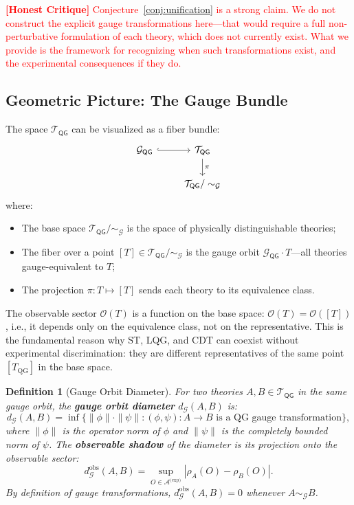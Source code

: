 \documentclass[12pt,a4paper]{article}
\newtheorem{definition}[theorem]{Definition}
\theoremstyle{remark}
\newcommand{\Obs}{\mathcal{O}}
\newcommand{\G}{\mathcal{G}}
\newcommand{\T}{\mathcal{T}}
\newcommand{\A}{\mathcal{A}}
\newcommand{\QG}{\textsf{QG}}
\newcommand{\honestcrit}[1]{\textcolor{red}{\textbf{[Honest Critique]} #1}}
\begin{document}
\honestcrit{Conjecture~\ref{conj:unification} is a strong claim. We do not construct the explicit gauge transformations here---that would require a full non-perturbative formulation of each theory, which does not currently exist. What we provide is the framework for recognizing when such transformations exist, and the experimental consequences if they do.}

\subsection{Geometric Picture: The Gauge Bundle}

The space $\T_{\QG}$ can be visualized as a fiber bundle:
\begin{equation}
  \begin{tikzcd}
    \G_{\QG} \arrow[r, hook] & \T_{\QG} \arrow[d, "\pi"] \\
    & \T_{\QG} / \sim_{\G}
  \end{tikzcd}
\end{equation}
where:
\begin{itemize}[leftmargin=*]
  \item The base space $\T_{\QG} / \sim_{\G}$ is the space of physically distinguishable theories;
  \item The fiber over a point $[T] \in \T_{\QG} / \sim_{\G}$ is the gauge orbit $\G_{\QG} \cdot T$---all theories gauge-equivalent to $T$;
  \item The projection $\pi: T \mapsto [T]$ sends each theory to its equivalence class.
\end{itemize}

The observable sector $\Obs(T)$ is a function on the base space: $\Obs(T) = \Obs([T])$, i.e., it depends only on the equivalence class, not on the representative. This is the fundamental reason why ST, LQG, and CDT can coexist without experimental discrimination: they are different representatives of the same point $[T_{\text{QG}}]$ in the base space.

\begin{definition}[Gauge Orbit Diameter]
\label{def:orbit_diameter}
For two theories $A, B \in \T_{\QG}$ in the same gauge orbit, the \textbf{gauge orbit diameter} $d_{\G}(A, B)$ is:
\begin{equation}
  d_{\G}(A, B) = \inf\{\|\phi\| \cdot \|\psi\| : (\phi, \psi): A \to B \text{ is a QG gauge transformation}\},
\end{equation}
where $\|\phi\|$ is the operator norm of $\phi$ and $\|\psi\|$ is the completely bounded norm of $\psi$. The \textbf{observable shadow} of the diameter is its projection onto the observable sector:
\begin{equation}
  d_{\G}^{\text{obs}}(A, B) = \sup_{O \in \A^{\text{(exp)}}} |\rho_A(O) - \rho_B(O)|.
\end{equation}
By definition of gauge transformations, $d_{\G}^{\text{obs}}(A, B) = 0$ whenever $A \sim_{\G} B$.
\end{definition}
\end{document}
